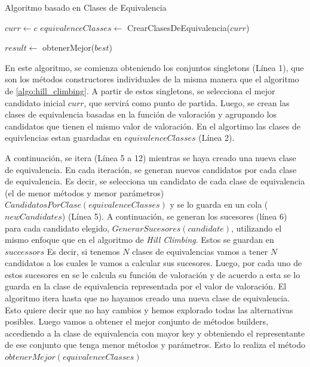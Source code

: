\begin{algorithm}[H]
  \caption{Algoritmo basado en Clases de Equivalencia}
  \label{algo:clases_equivalencia}
  \SetAlgoLined
  $curr \gets c$\; 
  $equivalenceClasses \gets$ CrearClasesDeEquivalencia($curr$)\;
  
  
  $result \gets$ obtenerMejor($best$)\;
  \;
\end{algorithm}

En este algoritmo, se comienza obteniendo los conjuntos singletons (Línea 1), que son los métodos constructores individuales de la misma manera que el algoritmo de \ref{algo:hill_climbing}. A partir de estos singletons, se selecciona el mejor candidato inicial $curr$, que servirá como punto de partida. Luego, se crean las clases de equivalencia basadas en la función de valoración y agrupando los candidatos que tienen el mismo valor de valoración. En el algortimo las clases de equivlencias estan guardadas en $equivalenceClasses$ (Línea 2).

A continuación, se itera (Línea 5 a 12) mientras se haya creado una nueva clase de equivalencia. En cada iteración, se generan nuevos candidatos por cada clase de equivalencia. Es decir, se selecciona un candidato de cada clase de equivalencia (el de menor métodos y menor parámetros) $CandidatosPorClase(equivalenceClasses)$ y se lo guarda en un cola ($newCandidates$) (Línea 5). A continuación, se generan los sucesores (línea 6) para cada candidato elegido, $GenerarSucesores(candidate)$, utilizando el mismo enfoque que en el algoritmo de \emph{Hill Climbing}. Estos se guardan en $successors$ Es decir, si tenemos $N$ clases de equivalencias vamos a tener $N$ candidatos a los cuales le vamos a calcular sus sucesores.  Luego, por cada uno de estos sucesores en  se le calcula su función de valoración y de acuerdo a esta se lo guarda en la clase de equivalencia representada por el valor de valoración.
El algoritmo itera hasta que no hayamos creado una nueva clase de equivalencia. Esto quiere decir que no hay cambios y hemos explorado todas las alternativas posibles. 
Luego vamos a obtener el mejor conjunto de métodos builders, accediendo a la clase de equivalencia con mayor key y obteniendo el representante de ese conjunto que tenga menor métodos y parámetros. Esto lo realiza el método $obtenerMejor(equivalenceClasses)$



